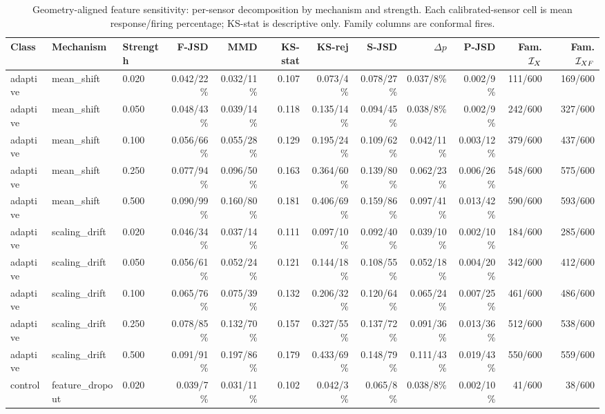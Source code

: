 \begin{table}[!t]
\caption{Geometry-aligned feature sensitivity: per-sensor decomposition by mechanism and strength. Each calibrated-sensor cell is mean response/firing percentage; KS-stat is descriptive only. Family columns are conformal fires.}
\label{tab:v137-decomp-4}
\centering\scriptsize\renewcommand{\arraystretch}{0.94}\setlength{\tabcolsep}{2.1pt}
\begin{tabular}{@{}lllrrrrrrrrr@{}}
\toprule
Class & Mechanism & Strength & F-JSD & MMD & KS-stat & KS-rej & S-JSD & $\Delta p$ & P-JSD & Fam. $\mathcal I_X$ & Fam. $\mathcal I_{XF}$ \\
\midrule
adaptive & mean\_shift & 0.020 & 0.042/22\% & 0.032/11\% & 0.107 & 0.073/4\% & 0.078/27\% & 0.037/8\% & 0.002/9\% & 111/600 & 169/600 \\
adaptive & mean\_shift & 0.050 & 0.048/43\% & 0.039/14\% & 0.118 & 0.135/14\% & 0.094/45\% & 0.038/8\% & 0.002/9\% & 242/600 & 327/600 \\
adaptive & mean\_shift & 0.100 & 0.056/66\% & 0.055/28\% & 0.129 & 0.195/24\% & 0.109/62\% & 0.042/11\% & 0.003/12\% & 379/600 & 437/600 \\
adaptive & mean\_shift & 0.250 & 0.077/94\% & 0.096/50\% & 0.163 & 0.364/60\% & 0.139/80\% & 0.062/23\% & 0.006/26\% & 548/600 & 575/600 \\
adaptive & mean\_shift & 0.500 & 0.090/99\% & 0.160/80\% & 0.181 & 0.406/69\% & 0.159/86\% & 0.097/41\% & 0.013/42\% & 590/600 & 593/600 \\
adaptive & scaling\_drift & 0.020 & 0.046/34\% & 0.037/14\% & 0.111 & 0.097/10\% & 0.092/40\% & 0.039/10\% & 0.002/10\% & 184/600 & 285/600 \\
adaptive & scaling\_drift & 0.050 & 0.056/61\% & 0.052/24\% & 0.121 & 0.144/18\% & 0.108/55\% & 0.052/18\% & 0.004/20\% & 342/600 & 412/600 \\
adaptive & scaling\_drift & 0.100 & 0.065/76\% & 0.075/39\% & 0.132 & 0.206/32\% & 0.120/64\% & 0.065/24\% & 0.007/25\% & 461/600 & 486/600 \\
adaptive & scaling\_drift & 0.250 & 0.078/85\% & 0.132/70\% & 0.157 & 0.327/55\% & 0.137/72\% & 0.091/36\% & 0.013/36\% & 512/600 & 538/600 \\
adaptive & scaling\_drift & 0.500 & 0.091/91\% & 0.197/86\% & 0.179 & 0.433/69\% & 0.148/79\% & 0.111/43\% & 0.019/43\% & 550/600 & 559/600 \\
control & feature\_dropout & 0.020 & 0.039/7\% & 0.031/11\% & 0.102 & 0.042/3\% & 0.065/8\% & 0.038/8\% & 0.002/10\% & 41/600 & 38/600 \\

\end{tabular}
\end{table}
